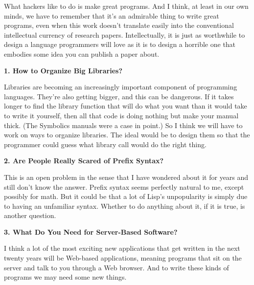What hackers like to
                    do is make great programs. And I think, at least in our own
                    minds, we have to remember that it's an admirable thing to
                    write great programs, even when this work doesn't translate
                    easily into the conventional intellectual currency of
                    research papers. Intellectually, it is just as worthwhile to
                    design a language programmers will love as it is to design a
                    horrible one that embodies some idea you can publish a paper
                    about.





\textbf{1. How to Organize Big Libraries?}

Libraries are becoming an increasingly
                    important component of programming languages. They're also
                    getting bigger, and this can be dangerous. If it takes
                    longer to find the library function that will do what you
                    want than it would take to write it yourself, then all that
                    code is doing nothing but make your manual thick. (The
                    Symbolics manuals were a case in point.) So I think we will
                    have to work on ways to organize libraries. The ideal would
                    be to design them so that the programmer could guess what
                    library call would do the right thing.

\textbf{2. Are People Really Scared of Prefix Syntax?}

This is an open problem in the sense that I
                    have wondered about it for years and still don't know the
                    answer. Prefix syntax seems perfectly natural to me, except
                    possibly for math. But it could be that a lot of Lisp's
                    unpopularity is simply due to having an unfamiliar syntax.
                    Whether to do anything about it, if it is true, is another
                    question.
                  


                  
                    \textbf{3. What Do You Need for Server-Based Software?}
                  


                  
                    I think a lot of the most exciting new applications that get
                    written in the next twenty years will be Web-based
                    applications, meaning programs that sit on the server and
                    talk to you through a Web browser. And to write these kinds
                    of programs we may need some new things.

